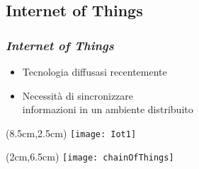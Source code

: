 \subsection{Internet of Things}
\begin{frame}
 \frametitle{\textit{Internet of Things}}

 \begin{itemize}
  \item<1-> Tecnologia diffusasi recentemente
  \item<2-> Necessit\`a di sincronizzare \\ informazioni in un ambiente
distribuito
 \end{itemize}

 \begin{textblock*}{5cm}(8.5cm,2.5cm)
  \texttt{[image: Iot1]}
 \end{textblock*}
 
 \begin{textblock*}{5cm}(2cm,6.5cm)
  \texttt{[image: chainOfThings]}
 \end{textblock*}

\end{frame}